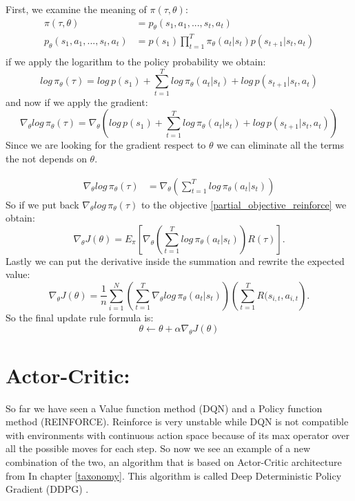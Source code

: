 First, we examine the meaning of $\pi(\tau,\theta)$:
\begin{align*}
\pi(\tau,\theta) &= p_\theta(s_1,a_1, ..., s_t,a_t)\\
p_\theta(s_1,a_1, ..., s_t,a_t) &= p(s_1) \prod_{t=1}^T \pi_\theta(a_t|s_t) p(s_{t+1} | s_t,a_t) \\
\end{align*}
if we apply the logarithm to the policy probability we obtain:
\begin{equation*}
log\,\pi_\theta(\tau) = log\,p(s_1) + \sum_{t=1}^T log\,\pi_\theta(a_t|s_t) + log\,p(s_{t+1}|s_t,a_t)
\end{equation*}
and now if we apply the gradient:
\begin{equation*}
\nabla_\theta log\,\pi_\theta(\tau) = \nabla_\theta \left( log\,p(s_1) + \sum_{t=1}^T log\,\pi_\theta(a_t|s_t) + log\,p(s_{t+1}|s_t,a_t) \right)
\end{equation*}
Since we are looking for the gradient respect to $\theta$ we can eliminate all the terms the not depends on $\theta$.

\begin{align*}
\nabla_\theta log\,\pi_\theta(\tau) &= \nabla_\theta \left( \sum_{t=1}^T log\,\pi_\theta(a_t|s_t) \right)
\end{align*}
So if we put back $\nabla_\theta log\,\pi_\theta(\tau)$ to the objective \ref{partial_objective_reinforce} we obtain:
\begin{equation*}
\nabla_\theta J(\theta) = E_\pi \left[ \nabla_\theta \left( \sum_{t=1}^T log\,\pi_\theta(a_t|s_t) \right)  R(\tau)\right].
\end{equation*}
Lastly we can put the derivative inside the summation and rewrite the expected value:
\begin{equation*}
\nabla_\theta J(\theta) = \frac{1}{n} \sum_{i=1}^N \left( \sum_{t=1}^T \nabla_\theta log\,\pi_\theta(a_t|s_t) \right)  \left( \sum_{t=1}^{T} R(s_{i,t},a_{i,t}\right).
\end{equation*}
So the final update rule formula is:
\begin{equation*}
\theta \leftarrow \theta + \alpha\nabla_\theta J(\theta)
\end{equation*}

\section{Actor-Critic:}
So far we have seen a Value function method (DQN) and a Policy function method (REINFORCE).
Reinforce is very unstable while DQN is not compatible with environments with continuous action space because of its max operator over all the possible moves for each step.
So now we see an example of a new combination of the two, an algorithm that is based on Actor-Critic architecture from In chapter \ref{taxonomy}.
This algorithm is called Deep Deterministic Policy Gradient (DDPG) \cite{lillicrap2015continuous}.


